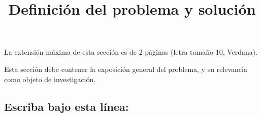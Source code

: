 \documentclass[10pt,prl]{revtex4}
\begin{document}
\title{ Definici\'on del problema y soluci\'on}
\maketitle

La extensi\'on m\'axima de esta secci\'on es de 2 p\'aginas (letra tama\~no 10, Verdana).

Esta secci\'on debe contener la exposici\'on general del problema, y su relevancia como objeto de investigaci\'on.


\maketitle
\subsection{Escriba bajo esta l\'inea:}
\end{document}
